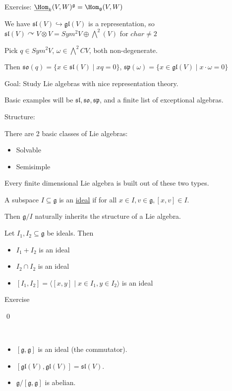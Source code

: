 \documentclass[x11names,reqno,14pt]{extarticle}
\newcommand{\mk}[1]{\mathfrak{#1}}
\newcommand{\g}{\mk{g}}
\newcommand{\so}{\mk{s}\mk{o}}
\renewcommand{\sp}{\mk{s}\mk{p}}
\newcommand{\into}{\hookrightarrow}
\newcommand{\gl}{\mk{g}\mk{l}}
\renewcommand{\sl}{\mk{s}\mk{l}}
\begin{document}
Exercise: $\underline{\Hom}_k(V,W)^\g = \Hom_\g(V,W)$

We have $\sl(V) \into \gl(V)$ is a representation, so $\sl(V) \curvearrowright V\otimes V = Sym^2V \oplus \bigwedge^2 (V)$ for $char \neq 2$

Pick $q \in Sym^2V$, $\omega \in \bigwedge^2CV$, both non-degenerate. 

Then $\so(q) = \{x\in \sl(V) \mid xq = 0\}$, $\sp(\omega) = \{x\in\gl(V) \mid x \cdot \omega = 0\}$

Goal: Study Lie algebras with nice representation theory.

Basic examples will be $\sl,\so,\sp$, and a finite list of exceptional algebras. 

Structure: 

There are 2 basic classes of Lie algebras:
 
\begin{itemize}

\item Solvable

\item Semisimple

\end{itemize}

Every finite dimensional Lie algebra is built out of these two types. 


A subspace $I\subseteq\g$ is an \underline{ideal} if for all $x \in I, v \in \g, [x,v] \in I$. 

Then $\g/I$ naturally inherits the structure of a Lie algebra. 

\lem

Let $I_1, I_2 \subseteq \g$ be ideals. Then 
\begin{itemize}

\item $I_1 + I_2$ is an ideal

\item $I_2 \cap I_2$ is an ideal 

\item $[I_1,I_2] = \langle[x,y] \mid x \in I_1, y \in I_2\rangle$ is an ideal 
\end{itemize}

\proof

Exercise

\qed

\exm
\,
\begin{itemize}

\item $[\g,\g]$ is an ideal (the commutator). 

\item $[\gl(V),\gl(V)] = \sl(V)$. 

\item $\g/[\g,\g]$ is abelian. 

\end{itemize}
\end{document}
